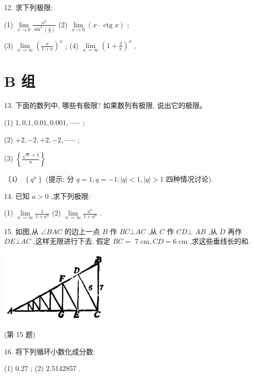 \documentclass[lang=cn,newtx,12pt,scheme=chinese]{elegantbook}
\begin{document}
12. 求下列极限:

(1) \(\mathop{\lim }\limits_{{x \rightarrow 0}}\frac{{x}^{2}}{{\sin }^{2}\left( \frac{x}{3}\right) }\) (2) \(\mathop{\lim }\limits_{{x \rightarrow 0}}\left( {x \cdot \operatorname{ctg}x}\right)\) ;

(3) \(\mathop{\lim }\limits_{{x \rightarrow \infty }}{\left( \frac{x}{1 + x}\right) }^{x}\) ; (4) \(\mathop{\lim }\limits_{{x \rightarrow \infty }}{\left( 1 + \frac{2}{x}\right) }^{x}\) .

\section*{B 组}

13. 下面的数列中, 哪些有极限? 如果数列有极限, 说出它的极限。

(1) \(1,{0.1},{0.01},{0.001},\cdots \cdots\) ;

(2) \(+ 2, - 2, + 2, - 2,\cdots \cdots\) ;

(3) \(\left\{ \frac{\sqrt{n} + 1}{n}\right\}\)

（4） \(\left\{ {q}^{n}\right\}\) (提示: 分 \(q = 1,q = - 1;\left| q\right| < 1,\left| q\right| > 1\) 四种情况讨论).

14. 已知 \(a > 0\) ,求下列极限:

(1) \(\mathop{\lim }\limits_{{n \rightarrow \infty }}\frac{1}{1 + {a}^{n}}\) (2) \(\mathop{\lim }\limits_{{n \rightarrow \infty }}\frac{{a}^{n}}{1 + {a}^{n}}\) .

15. 如图,从 \(\angle {BAC}\) 的边上一点 \(B\) 作 \({BC} \bot {AC}\) ,从 \(C\) 作 \({CD} \bot\) \({AB}\) ,从 \(D\) 再作 \({DE} \bot {AC}\) ,这样无限进行下去. 假定 \({BC} =\) \(7\mathrm{\;{cm}},{CD} = 6\mathrm{\;{cm}}\) ,求这些垂线长的和.

\begin{center}
	\includegraphics[max width=0.4\textwidth]{images/01912c18-5c3f-733d-b775-749ba9897a9d_52_461588.jpg}
\end{center}

(第 15 题)

16. 将下列循环小数化成分数:

(1) \({0.2}\dot{7}\) ; (2) 2.5142857 .
\end{document}
